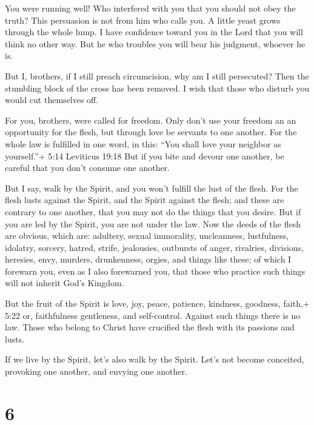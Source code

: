  You were running well! Who interfered with you that you
should not obey the truth?  This persuasion is not from him
who calls you.  A little yeast grows through the whole lump.
 I have confidence toward you in the Lord that you will
think no other way. But he who troubles you will bear his judgment,
whoever he is.

 But I, brothers, if I still preach circumcision, why am I
still persecuted? Then the stumbling block of the cross has been
removed.  I wish that those who disturb you would cut
themselves off.

 For you, brothers, were called for freedom. Only don't use
your freedom an an opportunity for the flesh, but through love be
servants to one another.  For the whole law is fulfilled in
one word, in this: ``You shall love your neighbor as yourself.''+ 5:14
Leviticus 19:18  But if you bite and devour one another, be
careful that you don't consume one another.

 But I say, walk by the Spirit, and you won't fulfill the
lust of the flesh.  For the flesh lusts against the Spirit,
and the Spirit against the flesh; and these are contrary to one another,
that you may not do the things that you desire.  But if you
are led by the Spirit, you are not under the law.  Now the
deeds of the flesh are obvious, which are: adultery, sexual immorality,
uncleanness, lustfulness,  idolatry, sorcery, hatred,
strife, jealousies, outbursts of anger, rivalries, divisions, heresies,
 envy, murders, drunkenness, orgies, and things like these;
of which I forewarn you, even as I also forewarned you, that those who
practice such things will not inherit God's Kingdom.

 But the fruit of the Spirit is love, joy, peace, patience,
kindness, goodness, faith,+ 5:22 or, faithfulness 
gentleness, and self-control. Against such things there is no law.
 Those who belong to Christ have crucified the flesh with
its passions and lusts.

 If we live by the Spirit, let's also walk by the Spirit.
 Let's not become conceited, provoking one another, and
envying one another.

\hypertarget{section-5}{%
\section{6}\label{section-5}}

